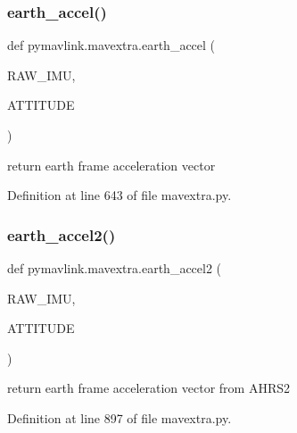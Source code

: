 \mbox{\label{namespacepymavlink_1_1mavextra_a3c2fd630569590cbbdb6fc602eb242b4}} 
\subsubsection{\texorpdfstring{earth\_accel()}{earth\_accel()}}
{\footnotesize\ttfamily def pymavlink.\+mavextra.\+earth\+\_\+accel (\begin{DoxyParamCaption}\item[{}]{R\+A\+W\+\_\+\+I\+MU,  }\item[{}]{A\+T\+T\+I\+T\+U\+DE }\end{DoxyParamCaption})}

\begin{DoxyVerb}return earth frame acceleration vector\end{DoxyVerb}
 

Definition at line 643 of file mavextra.\+py.

\mbox{\label{namespacepymavlink_1_1mavextra_a2e8ffaaf018bdd21bcc0dac891e88407}} 
\subsubsection{\texorpdfstring{earth\_accel2()}{earth\_accel2()}}
{\footnotesize\ttfamily def pymavlink.\+mavextra.\+earth\+\_\+accel2 (\begin{DoxyParamCaption}\item[{}]{R\+A\+W\+\_\+\+I\+MU,  }\item[{}]{A\+T\+T\+I\+T\+U\+DE }\end{DoxyParamCaption})}

\begin{DoxyVerb}return earth frame acceleration vector from AHRS2\end{DoxyVerb}
 

Definition at line 897 of file mavextra.\+py.

\mbox{\label{namespacepymavlink_1_1mavextra_a40df15a3e1e1a67b2bb53a0b73d48d63}} 
